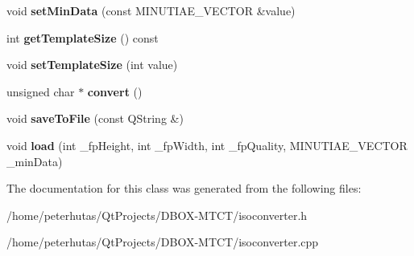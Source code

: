 \begin{DoxyCompactItemize}
void {\bfseries set\+Min\+Data} (const M\+I\+N\+U\+T\+I\+A\+E\+\_\+\+V\+E\+C\+T\+OR \&value)
\item 
\mbox{\label{class_i_s_o_converter_a99dd262e2f055c6dd0e9daf8910ffd4d}} 
int {\bfseries get\+Template\+Size} () const
\item 
\mbox{\label{class_i_s_o_converter_ab77d0a058f0a169f6f4e612ad1f36b1d}} 
void {\bfseries set\+Template\+Size} (int value)
\item 
\mbox{\label{class_i_s_o_converter_af5d884faf9a69528c5dab03d13255373}} 
unsigned char $\ast$ {\bfseries convert} ()
\item 
\mbox{\label{class_i_s_o_converter_a779c6bf1962fa910bf98c31a01b10546}} 
void {\bfseries save\+To\+File} (const Q\+String \&)
\item 
\mbox{\label{class_i_s_o_converter_a218b7b56ba5fc8d7b4da8bac4ad099ba}} 
void {\bfseries load} (int \+\_\+fp\+Height, int \+\_\+fp\+Width, int \+\_\+fp\+Quality, M\+I\+N\+U\+T\+I\+A\+E\+\_\+\+V\+E\+C\+T\+OR \+\_\+min\+Data)
\end{DoxyCompactItemize}


The documentation for this class was generated from the following files\+:\begin{DoxyCompactItemize}
\item 
/home/peterhutas/\+Qt\+Projects/\+D\+B\+O\+X-\/\+M\+T\+C\+T/isoconverter.\+h\item 
/home/peterhutas/\+Qt\+Projects/\+D\+B\+O\+X-\/\+M\+T\+C\+T/isoconverter.\+cpp\end{DoxyCompactItemize}
